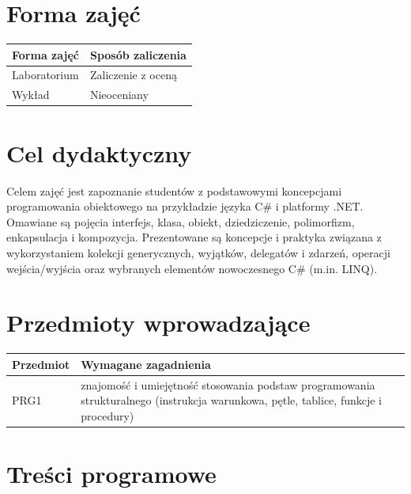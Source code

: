 \documentclass[12pt, a4paper]{article}
\begin{document}
\section{Forma zajęć}

\begin{tabular}{ll}
  \hline
  \textbf{Forma zajęć} & \textbf{Sposób zaliczenia} \\
  \hline
  Laboratorium & Zaliczenie z oceną \\
  Wykład & Nieoceniany \\
  \hline
\end{tabular}

\section{Cel dydaktyczny}

Celem zajęć jest zapoznanie studentów z podstawowymi koncepcjami programowania obiektowego na przykładzie języka C\# i platformy .NET. Omawiane są pojęcia interfejs, klasa, obiekt, dziedziczenie, polimorfizm, enkapsulacja i kompozycja. Prezentowane są koncepcje i praktyka związana z wykorzystaniem kolekcji generycznych, wyjątków, delegatów i zdarzeń, operacji wejścia/wyjścia oraz wybranych elementów nowoczesnego C\# (m.in. LINQ).

\section{Przedmioty wprowadzające}

\begin{tabularx}{\textwidth}{lX}
  \hline
  \textbf{Przedmiot} & \textbf{Wymagane zagadnienia} \\
  \hline
  PRG1 & znajomość i umiejętność stosowania podstaw programowania strukturalnego (instrukcja warunkowa, pętle, tablice, funkcje i procedury) \\
  \hline
\end{tabularx}

\section{Treści programowe}
\end{document}
